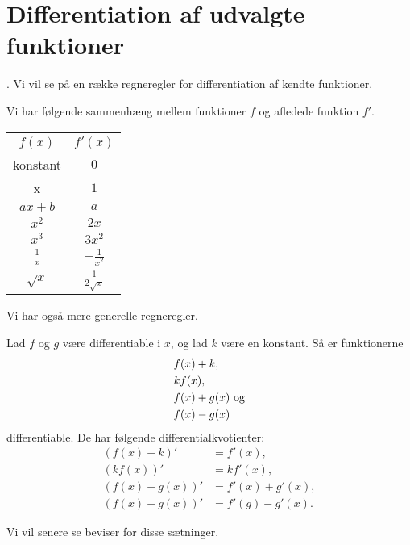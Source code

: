 \section*{Differentiation af udvalgte funktioner}.
Vi vil se på en række regneregler for differentiation af kendte funktioner. 
\begin{setn}
Vi har følgende sammenhæng mellem funktioner $f$ og afledede funktion $f'$.
\begin{center}
\begin{tabular}{c|c}
$f(x)$& $f'(x)$\\
\hline
\textnormal{konstant}&$0$\\
\hline
x&$1$\\
\hline
$ax+b$&$a$\\
\hline
$x^2$&$2x$\\
\hline
$x^3$&$3x^2$\\
\hline
$\frac{1}{x}$&$-\frac{1}{x^2}$\\
\hline
$\sqrt{x}$&$\frac{1}{2\sqrt{x}}$
\end{tabular}
\end{center}
\end{setn}
Vi har også mere generelle regneregler.
\begin{setn}
Lad $f$ og $g$ være differentiable i $x$, og lad $k$ være en konstant. Så er funktionerne
\begin{align*}
&f(x) + k,\\
&kf(x),\\
&f(x)+g(x) \textnormal{ og}\\
&f(x)-g(x)
\end{align*}
differentiable. De har følgende differentialkvotienter:
\begin{align*}
(f(x)+k)'&= f'(x),\\
(kf(x))' &= kf'(x),\\
(f(x)+g(x))' &= f'(x)+g'(x),\\
(f(x)-g(x))' &= f'(g)-g'(x).
\end{align*}
\end{setn}
Vi vil senere se beviser for disse sætninger. 
